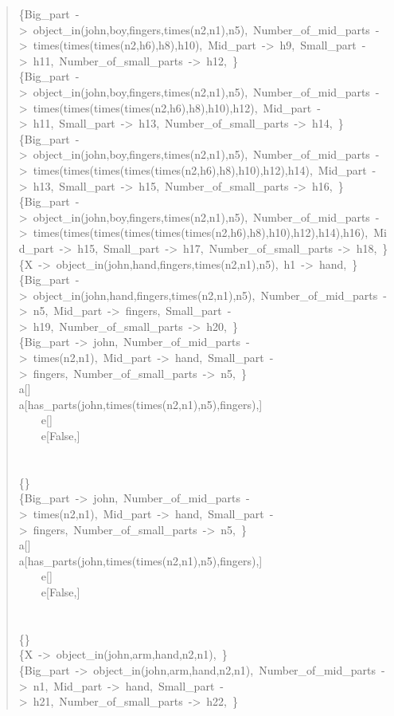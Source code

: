 \begin{quote}
\{Big\_part~->~object\_in(john,boy,fingers,times(n2,n1),n5),~Number\_of\_mid\_parts~->~times(times(times(n2,h6),h8),h10),~Mid\_part~->~h9,~Small\_part~->~h11,~Number\_of\_small\_parts~->~h12,~\}\\
\{Big\_part~->~object\_in(john,boy,fingers,times(n2,n1),n5),~Number\_of\_mid\_parts~->~times(times(times(times(n2,h6),h8),h10),h12),~Mid\_part~->~h11,~Small\_part~->~h13,~Number\_of\_small\_parts~->~h14,~\}\\
\{Big\_part~->~object\_in(john,boy,fingers,times(n2,n1),n5),~Number\_of\_mid\_parts~->~times(times(times(times(times(n2,h6),h8),h10),h12),h14),~Mid\_part~->~h13,~Small\_part~->~h15,~Number\_of\_small\_parts~->~h16,~\}\\
\{Big\_part~->~object\_in(john,boy,fingers,times(n2,n1),n5),~Number\_of\_mid\_parts~->~times(times(times(times(times(times(n2,h6),h8),h10),h12),h14),h16),~Mid\_part~->~h15,~Small\_part~->~h17,~Number\_of\_small\_parts~->~h18,~\}\\
\{X~->~object\_in(john,hand,fingers,times(n2,n1),n5),~h1~->~hand,~\}\\
\{Big\_part~->~object\_in(john,hand,fingers,times(n2,n1),n5),~Number\_of\_mid\_parts~->~n5,~Mid\_part~->~fingers,~Small\_part~->~h19,~Number\_of\_small\_parts~->~h20,~\}\\
\{Big\_part~->~john,~Number\_of\_mid\_parts~->~times(n2,n1),~Mid\_part~->~hand,~Small\_part~->~fingers,~Number\_of\_small\_parts~->~n5,~\}\\
a[]\\
a[has\_parts(john,times(times(n2,n1),n5),fingers),]\\
~~~~e[]\\
~~~~e[False,]\\
~\\
~\\
\{\}\\
\{Big\_part~->~john,~Number\_of\_mid\_parts~->~times(n2,n1),~Mid\_part~->~hand,~Small\_part~->~fingers,~Number\_of\_small\_parts~->~n5,~\}\\
a[]\\
a[has\_parts(john,times(times(n2,n1),n5),fingers),]\\
~~~~e[]\\
~~~~e[False,]\\
~\\
~\\
\{\}\\
\{X~->~object\_in(john,arm,hand,n2,n1),~\}\\
\{Big\_part~->~object\_in(john,arm,hand,n2,n1),~Number\_of\_mid\_parts~->~n1,~Mid\_part~->~hand,~Small\_part~->~h21,~Number\_of\_small\_parts~->~h22,~\}\\

\end{quote}
